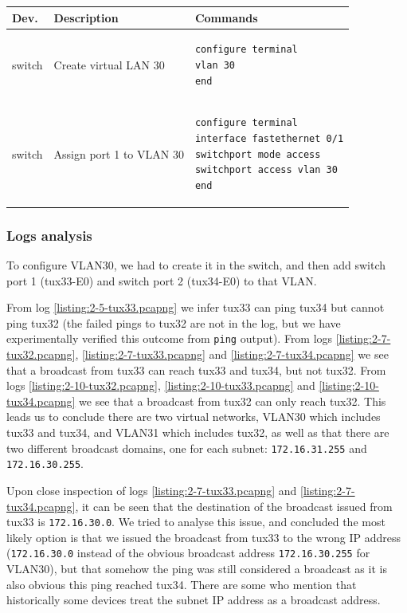 \documentclass[a4paper, 11pt]{report}
\begin{document}
\begin{center}
    \small
    \begin{tabular}{@{}l | m{93mm} | l@{}}
        {\normalfont\textbf{Dev.}} & {\normalfont\textbf{Description}} & {\normalfont\textbf{Commands}}  \\ \hline
        switch        & Create virtual LAN 30                                 &
            \begin{lstlisting}[basicstyle=\linespread{0.85}\ttfamily\small, frame=none, numbers=none, language=cisco]
configure terminal
vlan 30
end
            \end{lstlisting} \\
        switch        & Assign port 1 to VLAN 30                              & 
            \begin{lstlisting}[basicstyle=\linespread{0.85}\ttfamily\small, frame=none, numbers=none, language=cisco]
configure terminal
interface fastethernet 0/1
switchport mode access
switchport access vlan 30
end
            \end{lstlisting} \\
    \end{tabular}
\end{center}

\subsubsection{Logs analysis} \label{sec:Log2}

To configure VLAN30, we had to create it in the switch, and then add switch port 1 (tux33-E0) and switch port 2 (tux34-E0) to that VLAN.

From log \ref{listing:2-5-tux33.pcapng} we infer tux33 can ping tux34 but cannot ping tux32 (the failed pings to tux32 are not in the log, but we have experimentally verified this outcome from \texttt{ping} output).
From logs \ref{listing:2-7-tux32.pcapng}, \ref{listing:2-7-tux33.pcapng} and \ref{listing:2-7-tux34.pcapng} we see that a broadcast from tux33 can reach tux33 and tux34, but not tux32.
From logs \ref{listing:2-10-tux32.pcapng}, \ref{listing:2-10-tux33.pcapng} and \ref{listing:2-10-tux34.pcapng} we see that a broadcast from tux32 can only reach tux32.
This leads us to conclude there are two virtual networks, VLAN30 which includes tux33 and tux34, and VLAN31 which includes tux32, as well as that there are two different broadcast domains, one for each subnet: \texttt{172.16.31.255} and \texttt{172.16.30.255}.

Upon close inspection of logs \ref{listing:2-7-tux33.pcapng} and \ref{listing:2-7-tux34.pcapng}, it can be seen that the destination of the broadcast issued from tux33 is \texttt{172.16.30.0}.
We tried to analyse this issue, and concluded the most likely option is that we issued the broadcast from tux33 to the wrong IP address (\texttt{172.16.30.0} instead of the obvious broadcast address \texttt{172.16.30.255} for VLAN30), but that somehow the ping was still considered a broadcast as it is also obvious this ping reached tux34.
There are some \cite{ping-subnet-address-1}\cite{ping-subnet-address-2} who mention that historically some devices treat the subnet IP address as a broadcast address.
\end{document}
